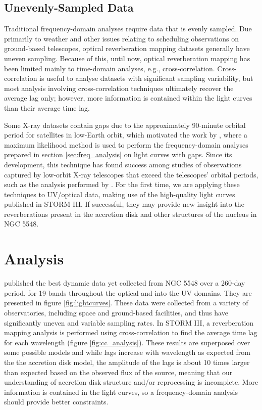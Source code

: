 \documentclass[11pt,letterpaper]{article}
\begin{document}
	\subsection{Unevenly-Sampled Data}
    \label{sec:uneven_data}

    Traditional frequency-domain analyses require data that is evenly sampled. Due primarily to weather and other issues relating to scheduling observations on ground-based telescopes, optical reverberation mapping datasets generally have uneven sampling. Because of this, until now, optical reverberation mapping has been limited mainly to time-domain analyses, e.g., cross-correlation. Cross-correlation is useful to analyse datasets with significant sampling variability, but most analysis involving cross-correlation techniques ultimately recover the average lag only; however, more information is contained within the light curves than their average time lag.

    Some X-ray datasets contain gaps due to the approximately 90-minute orbital period for satellites in low-Earth orbit, which motivated the work by \cite{2013ApJ...777...24Z}, where a maximum likelihood method is used to perform the frequency-domain analyses prepared in section \ref{sec:freq_analysis} on light curves with gaps. Since its development, this technique has found success among studies of observations captured by low-orbit X-ray telescopes that exceed the telescopes' orbital periods, such as the analysis performed by \cite{2016Natur.535..388K}. For the first time, we are applying these techniques to UV/optical data, making use of the high-quality light curves published in STORM III. If successful, they may provide new insight into the reverberations present in the accretion disk and other structures of the nucleus in NGC 5548.

\section{Analysis}
\label{analysis}
\cite{2016ApJ...821...56F} published the best dynamic data yet collected from NGC 5548 over a 260-day period, for 19 bands throughout the optical and into the UV domains. They are presented in figure \ref{fig:lightcurves}. These data were collected from a variety of observatories, including space and ground-based facilities, and thus have significantly uneven and variable sampling rates. In STORM III, a reverberation mapping analysis is performed using cross-correlation to find the average time lag for each wavelength (figure \ref{fig:cc_analysis}). These results are superposed over some possible models and while lags increase with wavelength as expected from the the accretion disk model, the amplitude of the lags is about 10 times larger than expected based on the observed flux of the source, meaning that our understanding of accretion disk structure and/or reprocessing is incomplete. More information is contained in the light curves, so a frequency-domain analysis should provide better constraints.
\end{document}
